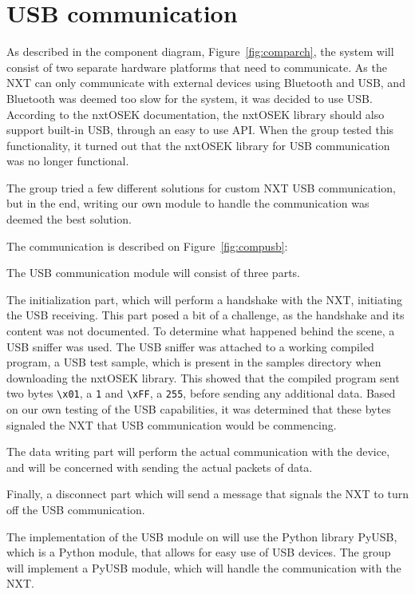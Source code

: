 \section{USB communication}
\label{sec:usbdes}
As described in the component diagram, Figure~\ref{fig:comparch}, the system will consist of two separate hardware platforms that need to communicate.
As the NXT can only communicate with external devices using Bluetooth and USB, and Bluetooth was deemed too slow for the system, it was decided to use USB.
According to the nxtOSEK documentation, the nxtOSEK library should also support built-in USB, through an easy to use API\cite{ecrobotUSB}.
When the group tested this functionality, it turned out that the nxtOSEK library for USB communication was no longer functional.

The group tried a few different solutions for custom NXT USB communication, but in the end, writing our own module to handle the communication was deemed the best solution.

The communication is described on Figure~\ref{fig:compusb}:


The USB communication module will consist of three parts.

The initialization part, which will perform a handshake with the NXT, initiating the USB receiving.
This part posed a bit of a challenge, as the handshake and its content was not documented.
To determine what happened behind the scene, a USB sniffer was used.
The USB sniffer was attached to a working compiled program, a USB test sample, which is present in the samples directory when downloading the nxtOSEK library\cite{ecrobotUSB}.
This showed that the compiled program sent two bytes \texttt{\textbackslash{}x01}, a \texttt{1} and \texttt{\textbackslash{}xFF}, a \texttt{255}, before sending any additional data.%
Based on our own testing of the USB capabilities, it was determined that these bytes signaled the NXT that USB communication would be commencing.

The data writing part will perform the actual communication with the device, and will be concerned with sending the actual packets of data.

Finally, a disconnect part which will send a message that signals the NXT to turn off the USB communication.

The implementation of the USB module on will use the Python library PyUSB, which is a Python module, that allows for easy use of USB devices\cite{PyUSB}.
The group will implement a PyUSB module, which will handle the communication with the NXT.
